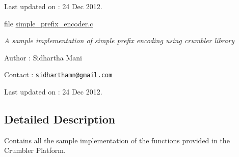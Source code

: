 \begin{DoxyCompactItemize}
\begin{DoxyCompactList}
 Last updated on \-: 24 Dec 2012. \end{DoxyCompactList}\item 
file \hyperlink{simple__prefix__encoder_8c}{simple\-\_\-prefix\-\_\-encoder.\-c}
\begin{DoxyCompactList}\small\item\em A sample implementation of simple prefix encoding using crumbler library \par
 Author \-: Sidhartha Mani \par
 Contact \-: \href{mailto:sidharthamn@gmail.com}{\tt sidharthamn@gmail.\-com} \par
 Last updated on \-: 24 Dec 2012. \end{DoxyCompactList}\end{DoxyCompactItemize}


\subsection{Detailed Description}
Contains all the sample implementation of the functions provided in the Crumbler Platform. 
